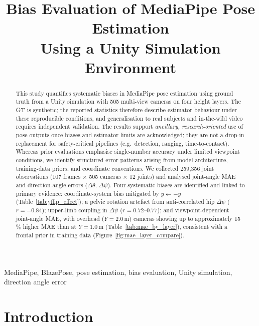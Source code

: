 \documentclass[english,fleqn]{ieej-e}
\title{Bias Evaluation of MediaPipe Pose Estimation\\
       Using a Unity Simulation Environment}
\begin{document}
\begin{abstract}
This study quantifies systematic biases in MediaPipe pose estimation using
ground truth from a Unity simulation with 505 multi-view cameras on four
height layers.
The GT is synthetic; the reported statistics therefore describe estimator
behaviour under these reproducible conditions, and generalisation to real
subjects and in-the-wild video requires independent validation.
The results support \emph{ancillary, research-oriented} use of pose outputs
once biases and estimator limits are acknowledged; they are not a drop-in
replacement for safety-critical pipelines (e.g.\ detection, ranging, time-to-contact).
Whereas prior evaluations emphasise single-number accuracy under limited
viewpoint conditions, we identify structured error patterns arising from model
architecture, training-data priors, and coordinate conventions.
We collected 259{,}356 joint observations (107 frames $\times$ 505 cameras
$\times$ 12 joints) and analysed joint-angle MAE and direction-angle errors
($\Delta\theta$, $\Delta\psi$).
Four systematic biases are identified and linked to primary evidence:
coordinate-system bias mitigated by $y \leftarrow -y$
(Table~\ref{tab:yflip_effect}); a pelvic rotation artefact from
anti-correlated hip $\Delta\psi$ ($r=-0.84$); upper-limb coupling in
$\Delta\psi$ ($r=0.72$--$0.77$); and viewpoint-dependent joint-angle MAE,
with overhead ($Y{=}2.0$\,m) cameras showing up to approximately 15\,\% higher
MAE than at $Y{=}1.0$\,m (Table~\ref{tab:mae_by_layer}), consistent with a
frontal prior in training data (Figure~\ref{fig:mae_layer_compare}).
\end{abstract}
\begin{keyword}
MediaPipe, BlazePose, pose estimation, bias evaluation, Unity simulation,
direction angle error
\end{keyword}
\maketitle
\section{Introduction}
\end{document}
